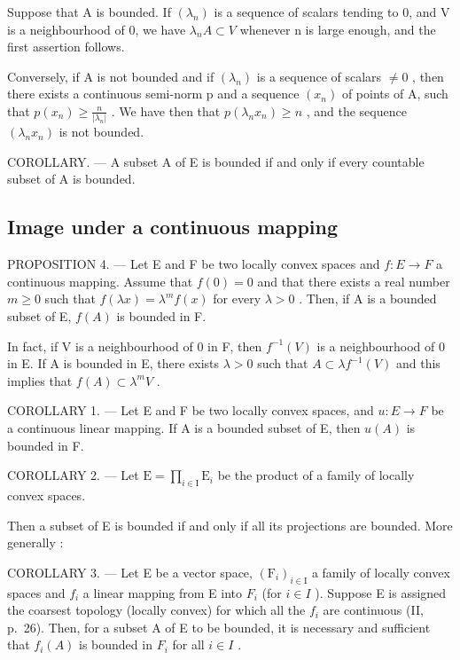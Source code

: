 Suppose that A is bounded. If \((\lambda_{n})\) is a sequence of scalars tending to 0, and V is a neighbourhood of 0, we have \(\lambda_{n}A \subset V\) whenever n is large enough, and the first assertion follows.

Conversely, if A is not bounded and if \((\lambda_{n})\) is a sequence of scalars \(\neq 0\) , then there exists a continuous semi-norm p and a sequence \((x_{n})\) of points of A, such that \(p(x_{n}) \geqslant \frac{n}{|\lambda_{n}|}\) . We have then that \(p(\lambda_{n}x_{n}) \geqslant n\) , and the sequence \((\lambda_{n}x_{n})\) is not bounded.

COROLLARY. --- A subset A of E is bounded if and only if every countable subset of A is bounded.

\subsection{Image under a continuous mapping}

PROPOSITION 4. --- Let E and F be two locally convex spaces and \(f:E \rightarrow F\) a continuous mapping. Assume that \(f(0) = 0\) and that there exists a real number \(m \geqslant 0\) such that \(f(\lambda x) = \lambda^{m}f(x)\) for every \(\lambda > 0\) . Then, if A is a bounded subset of E, \(f(A)\) is bounded in F.

In fact, if V is a neighbourhood of 0 in F, then \(f^{-1}(V)\) is a neighbourhood of 0 in E. If A is bounded in E, there exists \(\lambda > 0\) such that \(A \subset \lambda f^{-1}(V)\) and this implies that \(f(A) \subset \lambda^{m}V\) .

COROLLARY 1. --- Let E and F be two locally convex spaces, and \(u:E\to F\) be a continuous linear mapping. If A is a bounded subset of E, then \(u(A)\) is bounded in F.

COROLLARY 2. --- Let \(\mathrm{E} = \prod_{i\in \mathrm{I}}\mathrm{E}_i\) be the product of a family of locally convex spaces.

Then a subset of E is bounded if and only if all its projections are bounded. More generally :

COROLLARY 3. --- Let E be a vector space, \((\mathrm{F}_{i})_{i\in\mathrm{I}}\) a family of locally convex spaces and \(f_{i}\) a linear mapping from E into \(F_{i}\) (for \(i\in I\) ). Suppose E is assigned the coarsest topology (locally convex) for which all the \(f_{i}\) are continuous (II, p.~26). Then, for a subset A of E to be bounded, it is necessary and sufficient that \(f_{i}(A)\) is bounded in \(F_{i}\) for all \(i\in I\) .


